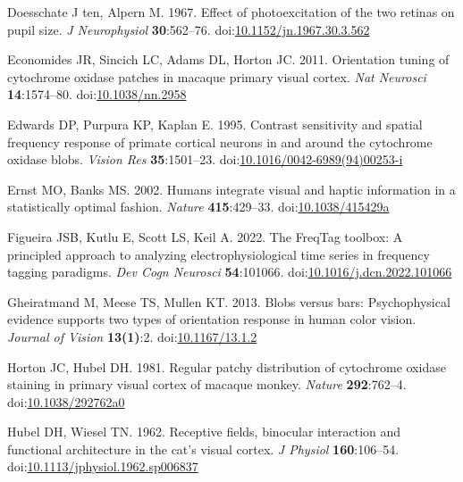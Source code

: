 \documentclass[
]{article}
\newlength{\cslhangindent}
\newlength{\cslentryspacingunit} %
\newenvironment{CSLReferences}[2] %
 {%
  \setlength{\parindent}{0pt}
  \ifodd #1
  \let\oldpar\par
  \def\par{\hangindent=\cslhangindent\oldpar}
  \fi
  \setlength{\parskip}{#2\cslentryspacingunit}
 }%
 {}
\begin{document}
\begin{CSLReferences}{1}{0}
\leavevmode{}%
Doesschate J ten, Alpern M. 1967. Effect of photoexcitation of the two retinas on pupil size. \emph{J Neurophysiol} \textbf{30}:562--76. doi:\href{https://doi.org/10.1152/jn.1967.30.3.562}{10.1152/jn.1967.30.3.562}

\leavevmode{}%
Economides JR, Sincich LC, Adams DL, Horton JC. 2011. Orientation tuning of cytochrome oxidase patches in macaque primary visual cortex. \emph{Nat Neurosci} \textbf{14}:1574--80. doi:\href{https://doi.org/10.1038/nn.2958}{10.1038/nn.2958}

\leavevmode{}%
Edwards DP, Purpura KP, Kaplan E. 1995. Contrast sensitivity and spatial frequency response of primate cortical neurons in and around the cytochrome oxidase blobs. \emph{Vision Res} \textbf{35}:1501--23. doi:\href{https://doi.org/10.1016/0042-6989(94)00253-i}{10.1016/0042-6989(94)00253-i}

\leavevmode{}%
Ernst MO, Banks MS. 2002. Humans integrate visual and haptic information in a statistically optimal fashion. \emph{Nature} \textbf{415}:429--33. doi:\href{https://doi.org/10.1038/415429a}{10.1038/415429a}

\leavevmode{}%
Figueira JSB, Kutlu E, Scott LS, Keil A. 2022. The FreqTag toolbox: A principled approach to analyzing electrophysiological time series in frequency tagging paradigms. \emph{Dev Cogn Neurosci} \textbf{54}:101066. doi:\href{https://doi.org/10.1016/j.dcn.2022.101066}{10.1016/j.dcn.2022.101066}

\leavevmode{}%
Gheiratmand M, Meese TS, Mullen KT. 2013. Blobs versus bars: Psychophysical evidence supports two types of orientation response in human color vision. \emph{Journal of Vision} \textbf{13(1)}:2. doi:\href{https://doi.org/10.1167/13.1.2}{10.1167/13.1.2}

\leavevmode{}%
Horton JC, Hubel DH. 1981. Regular patchy distribution of cytochrome oxidase staining in primary visual cortex of macaque monkey. \emph{Nature} \textbf{292}:762--4. doi:\href{https://doi.org/10.1038/292762a0}{10.1038/292762a0}

\leavevmode{}%
Hubel DH, Wiesel TN. 1962. Receptive fields, binocular interaction and functional architecture in the cat's visual cortex. \emph{J Physiol} \textbf{160}:106--54. doi:\href{https://doi.org/10.1113/jphysiol.1962.sp006837}{10.1113/jphysiol.1962.sp006837}


\end{CSLReferences}
\end{document}

